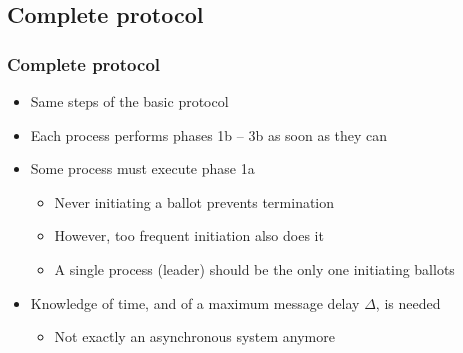 \documentclass[10 pt]{beamer}
\begin{document}
\subsection{Complete protocol}


\begin{frame}
  \frametitle{Complete protocol}
  
  \begin {itemize}
    \item Same steps of the basic protocol  
    
    \vspace{2mm}
    \item Each process performs phases 1b -- 3b as soon as they can  
    
    \vspace{2mm}
    \item Some process must execute phase 1a
    \begin{itemize}
      \item Never initiating a ballot prevents termination
      \item However, too frequent initiation also does it %
      \item A single process (leader) should be the only one initiating ballots %
    \end{itemize}
    
    \vspace{2mm}
    \item Knowledge of time, and of a maximum message delay $\Delta$, is needed
    \begin{itemize}
      \item Not exactly an asynchronous system anymore
    \end{itemize}
  \end{itemize}
  
\end{frame}
\end{document}
